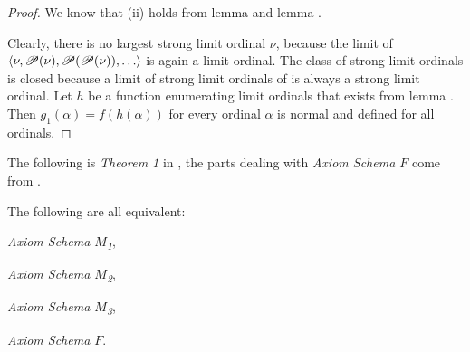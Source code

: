 \begin{proof}
We know that (ii) holds from lemma  and lemma .

Clearly, there is no largest strong limit ordinal $\nu$, because the limit of\\
$\langle \nu, \mathscr{P} (\nu), \mathscr{P} (\mathscr{P} (\nu)), \ldots \rangle$ is again a limit ordinal. %
The class of strong limit ordinals is closed because a limit of strong limit ordinals of is always a strong limit ordinal.
Let $h$ be a function enumerating limit ordinals that exists from lemma .
Then $g_1(\alpha) = f(h(\alpha))$ for every ordinal $\alpha$ is normal and defined for all ordinals.
\end{proof}

The following is \emph{Theorem 1} in \cite{Levy60a}, the parts dealing with \emph{Axiom Schema $F$} come from \cite{DrakeBook}.

\begin{theorem}
The following are all equivalent:
\bce[(i)]
\item \emph{Axiom Schema $M$\textsubscript{1}},
\item \emph{Axiom Schema $M$\textsubscript{2}},
\item \emph{Axiom Schema $M$\textsubscript{3}},
\item \emph{Axiom Schema $F$}.
\ece
\end{theorem}

